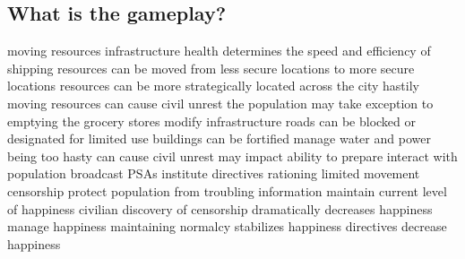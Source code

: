 \documentclass{article}
\begin{document}
\subsection{What is the gameplay?}

\begin{outline}[enumerate]
  \1 moving resources
    \2 infrastructure health determines the speed and efficiency of shipping
    \2 resources can be moved from less secure locations to more secure locations
    \2 resources can be more strategically located across the city
    \2 hastily moving resources can cause civil unrest
      \3 the population may take exception to emptying the grocery stores
  \1 modify infrastructure
    \2 roads can be blocked or designated for limited use
    \2 buildings can be fortified
    \2 manage water and power
      \3 being too hasty can cause civil unrest
      \3 may impact ability to prepare
  \1 interact with population
    \2 broadcast PSAs
    \2 institute directives
      \3 rationing
      \3 limited movement
    \2 censorship
      \3 protect population from troubling information
        \4 maintain current level of happiness
      \3 civilian discovery of censorship dramatically decreases happiness
    \2 manage happiness
      \3 maintaining normalcy stabilizes happiness
      \3 directives decrease happiness
      
\end{outline}

\end{document}
